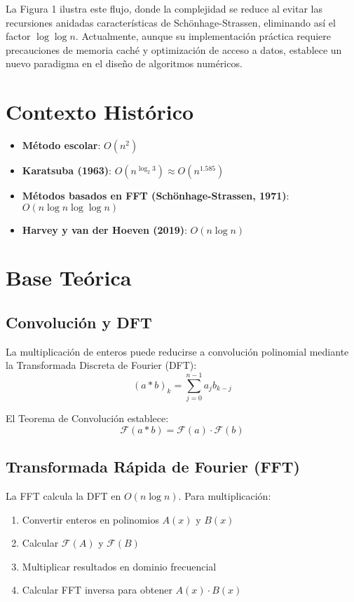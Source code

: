 \documentclass{article}
\begin{document}
La Figura 1 ilustra este flujo, donde la complejidad se reduce al evitar las recursiones anidadas características de Schönhage-Strassen, eliminando así el factor \( \log \log n \). Actualmente, aunque su implementación práctica requiere precauciones de memoria caché y optimización de acceso a datos, establece un nuevo paradigma en el diseño de algoritmos numéricos.

\section{Contexto Histórico}
\begin{itemize}
    \item \textbf{Método escolar}: \( O(n^2) \)
    \item \textbf{Karatsuba (1963)}: \( O(n^{\log_2 3}) \approx O(n^{1.585}) \)
    \item \textbf{Métodos basados en FFT (Schönhage-Strassen, 1971)}: \( O(n \log n \log \log n) \)
    \item \textbf{Harvey y van der Hoeven (2019)}: \( O(n \log n) \)
\end{itemize}

\section{Base Teórica}
\subsection{Convolución y DFT}
La multiplicación de enteros puede reducirse a convolución polinomial mediante la Transformada Discreta de Fourier (DFT):
\begin{equation}
    (a \ast b)_k = \sum_{j=0}^{n-1} a_j b_{k-j}
\end{equation}

El Teorema de Convolución establece:
\begin{equation}
    \mathcal{F}(a \ast b) = \mathcal{F}(a) \cdot \mathcal{F}(b)
\end{equation}

\subsection{Transformada Rápida de Fourier (FFT)}
La FFT calcula la DFT en \( O(n \log n) \). Para multiplicación:
\begin{enumerate}
    \item Convertir enteros en polinomios \( A(x) \) y \( B(x) \)
    \item Calcular \( \mathcal{F}(A) \) y \( \mathcal{F}(B) \)
    \item Multiplicar resultados en dominio frecuencial
    \item Calcular FFT inversa para obtener \( A(x) \cdot B(x) \)
\end{enumerate}
\end{document}
